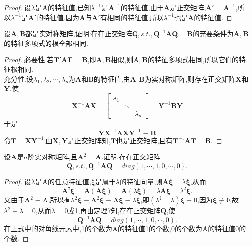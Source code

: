 \documentclass[lang=cn,11pt,normal]{elegantbook}
\renewcommand{\AA}{\boldsymbol{A}}
\newcommand{\BB}{\boldsymbol{B}}
\newcommand{\XX}{\boldsymbol{X}}
\newcommand{\YY}{\boldsymbol{Y}}
\newcommand{\TT}{\boldsymbol{T}}
\newcommand{\QQ}{\boldsymbol{Q}}
\begin{document}
	\begin{proof}
		设$\lambda$是$\AA$的特征值,已知$\lambda^{-1}$是$\AA^{-1}$的特征值,由于$\AA$是正交矩阵,$\AA'=\AA^{-1}$,所以$\lambda^{-1}$是$\AA'$的特征值.因为$\AA$与$\AA'$有相同的特征值,所以$\lambda^{-1}$也是$\AA$的特征值.
	\end{proof}
	\begin{exercise}
		设$\AA,\BB$都是实对称矩阵,证明:存在正交矩阵$\QQ,s.t.,\QQ^{-1}\boldsymbol{AQ}=\BB$的充要条件为$\AA,\BB$的特征多项式的根全部相同.
	\end{exercise}
	\begin{proof}
		必要性.若$\TT'\boldsymbol{AT}=\BB$,即$\AA,\BB$相似,则$\AA,\BB$的特征多项式相同,所以它们的特征根相同.\\
		充分性.设$\lambda_1,\lambda_2,\cdots,\lambda_n$为$\AA$和$\BB$的特征值,由$\AA,\BB$为实对称矩阵,则存在正交矩阵$\XX$和$\YY$,使
		\begin{equation}
		\XX^{-1}\boldsymbol{AX}=
		\begin{bmatrix}
		\lambda_1&&\\
		&\ddots&\\
		&&\lambda_n
		\end{bmatrix}
		=\YY^{-1}\boldsymbol{BY}
		\end{equation}
		于是
		\begin{equation}
		\boldsymbol{YX}^{-1}\boldsymbol{AXY}^{-1}=\BB
		\end{equation}
		令$\TT=\boldsymbol{XY}^{-1}$,由$\XX,\YY$是正交矩阵知,$\TT$也是正交矩阵,且有$\TT^{-1}\boldsymbol{AT}=\BB$.
	\end{proof}
	\begin{exercise}
		设$\AA$是$n$阶实对称矩阵,且$\AA^2=\AA$.证明:存在正交矩阵
		\begin{equation}
		\QQ,s.t.,\QQ^{-1}\boldsymbol{AQ}=diag\left(1,\cdots,1,0,\cdots,0\right).
		\end{equation}
	\end{exercise}
	\begin{proof}
		设$\lambda$是$\AA$的任意特征值,$\boldsymbol{\xi}$是属于$\lambda$的特征向量,则$\boldsymbol{A\xi}=\lambda\boldsymbol{\xi}$,从而
		\begin{equation}
		\AA^2\boldsymbol{\xi}=\AA(\boldsymbol{A\xi})=\AA(\lambda\boldsymbol{\xi})=\lambda\boldsymbol{A\xi}=\lambda^2\boldsymbol{\xi}.
		\end{equation}
		又由于$\AA^2=\AA$,所以有$\lambda^2\boldsymbol{\xi}=\AA^2\boldsymbol{\xi}=\boldsymbol{A\xi}=\lambda\boldsymbol{\xi}$,即$(\lambda^2-\lambda)\boldsymbol{\xi}=0$,因为$\boldsymbol{\xi}\ne\boldsymbol{0}$,故$\lambda^2-\lambda=0$,从而$\lambda=0$或1,再由定理7知,存在正交矩阵$\QQ$,使
		\begin{equation}
		\QQ^{-1}\boldsymbol{AQ}=diag\left(1,\cdots,1,0,\cdots,0\right).
		\end{equation}
		在上式中的对角线元素中,1的个数为$\AA$的特征值1的个数,0的个数为$\AA$的特征值0的个数.
	\end{proof}
\end{document}
